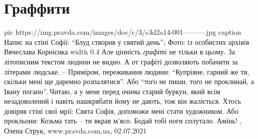  
 
 
 
 
\chapter{Граффити}
\label{sec:slova.graffiti}

\ifcmt
  pic https://img.pravda.com/images/doc/c/3/c3d2a14-001---------.jpg
	caption Напис на стіні Софії: \enquote{Блуд створив у святий день}; Фото: із особистих архівів Вячеслава Корнієнка
	width 0.4
\fi
Але цінність \emph{графіті} не тільки в цьому. За літописним текстом людини не
видно.  А от графіті дозволяють побачити за літерами людське.  – Приміром,
переживання людини: \enquote{Купріяне, гарний же ти, скільки мені ще даремно
розпалятися}. Або \enquote{того не пиши, того не проклинай, а Івану погано}.
Читаю, а у мене перед очима старий буркун, який всім незадоволений і навіть
нашкрябати йому не дають, тож він жаліється.  Хтось довіряв стіні свої мрії:
Свята Софія, допоможи мені стати художником.  Або прокльони: Козьма тать – ти
вкрав м'ясо. Бодай тобі ноги сплутало. Амінь!
, 
Олена Струк, www.pravda.com.ua, 02.07.2021 

